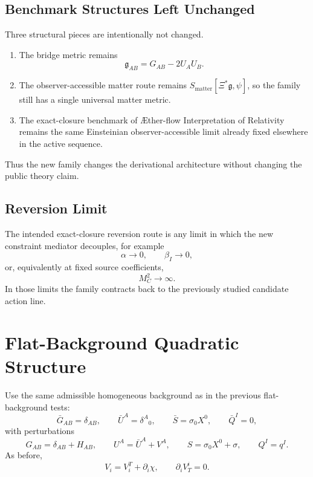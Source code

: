 \documentclass[11pt]{article}
\newcommand{\Aflow}{\AE{}ther-flow}
\newcommand{\TheoryName}{\Aflow{} Interpretation of Relativity}
\newcommand{\BridgeMetric}{\mathfrak{g}}
\begin{document}
\subsection{Benchmark Structures Left Unchanged}

Three structural pieces are intentionally not changed.
\begin{enumerate}
    \item The bridge metric remains
    \begin{equation}
    \BridgeMetric_{AB}=G_{AB}-2U_AU_B.
    \label{eq:bridgemetric}
    \end{equation}
    \item The observer-accessible matter route remains \(S_{\mathrm{matter}}[\Xi^*\BridgeMetric,\psi]\), so the family still has a single universal matter metric.
    \item The exact-closure benchmark of \TheoryName{} remains the same Einsteinian observer-accessible limit already fixed elsewhere in the active sequence.
\end{enumerate}

Thus the new family changes the derivational architecture without changing the public theory claim.

\subsection{Reversion Limit}

The intended exact-closure reversion route is any limit in which the new constraint mediator decouples, for example
\begin{equation}
\alpha\to 0,
\qquad
\beta_I\to 0,
\label{eq:reversion1}
\end{equation}
or, equivalently at fixed source coefficients,
\begin{equation}
M_C^2\to\infty.
\label{eq:reversion2}
\end{equation}
In those limits the family contracts back to the previously studied candidate action line.

\section{Flat-Background Quadratic Structure}

Use the same admissible homogeneous background as in the previous flat-background tests:
\begin{equation}
\bar G_{AB}=\delta_{AB},
\qquad
\bar U^A=\delta^A{}_0,
\qquad
\bar S=\sigma_0X^0,
\qquad
\bar Q^I=0,
\label{eq:background}
\end{equation}
with perturbations
\begin{equation}
G_{AB}=\delta_{AB}+H_{AB},
\qquad
U^A=\bar U^A+V^A,
\qquad
S=\sigma_0X^0+\sigma,
\qquad
Q^I=q^I.
\label{eq:perturbations}
\end{equation}
As before,
\begin{equation}
V_i=V_i^T+\partial_i\chi,
\qquad
\partial_iV_T^i=0.
\label{eq:Vdecomp}
\end{equation}
\end{document}

